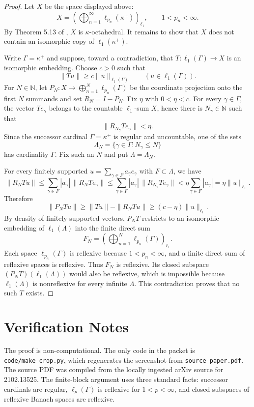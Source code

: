 \documentclass[11pt]{article}
\begin{document}
\begin{proof}
Let $X$ be the space displayed above:
\[
  X=\left(\bigoplus_{n=1}^\infty \ell_{p_n}(\kappa^+)\right)_{\ell_1},
  \qquad 1<p_n<\infty .
\]
By Theorem 5.13 of \cite{CLL}, $X$ is $\kappa$-octahedral.  It remains to show
that $X$ does not contain an isomorphic copy of $\ell_1(\kappa^+)$.

Write $\Gamma=\kappa^+$ and suppose, toward a contradiction, that
$T:\ell_1(\Gamma)\to X$ is an isomorphic embedding.  Choose $c>0$ such that
\[
  \|Tu\|\geq c\|u\|_{\ell_1(\Gamma)}
  \qquad (u\in \ell_1(\Gamma)).
\]
For $N\in\mathbb N$, let $P_N:X\to \bigoplus_{n=1}^N \ell_{p_n}(\Gamma)$ be
the coordinate projection onto the first $N$ summands and set
$R_N=I-P_N$.  Fix $\eta$ with $0<\eta<c$.  For every $\gamma\in\Gamma$,
the vector $Te_\gamma$ belongs to the countable $\ell_1$-sum $X$, hence there
is $N_\gamma\in\mathbb N$ such that
\[
  \|R_{N_\gamma}Te_\gamma\|<\eta .
\]
Since the successor cardinal $\Gamma=\kappa^+$ is regular and uncountable,
one of the sets
\[
  \Lambda_N=\{\gamma\in\Gamma:N_\gamma\leq N\}
\]
has cardinality $\Gamma$.  Fix such an $N$ and put $\Lambda=\Lambda_N$.

For every finitely supported
$u=\sum_{\gamma\in F}a_\gamma e_\gamma$ with $F\subset\Lambda$, we have
\[
  \|R_NTu\|
  \leq \sum_{\gamma\in F}|a_\gamma|\,\|R_NTe_\gamma\|
  \leq \sum_{\gamma\in F}|a_\gamma|\,\|R_{N_\gamma}Te_\gamma\|
  < \eta\sum_{\gamma\in F}|a_\gamma|
  = \eta\|u\|_{\ell_1}.
\]
Therefore
\[
  \|P_NTu\|\geq \|Tu\|-\|R_NTu\|
  \geq (c-\eta)\|u\|_{\ell_1}.
\]
By density of finitely supported vectors, $P_NT$ restricts to an isomorphic
embedding of $\ell_1(\Lambda)$ into the finite direct sum
\[
  F_N=\left(\bigoplus_{n=1}^N \ell_{p_n}(\Gamma)\right)_{\ell_1}.
\]
Each space $\ell_{p_n}(\Gamma)$ is reflexive because $1<p_n<\infty$, and a
finite direct sum of reflexive spaces is reflexive.  Thus $F_N$ is reflexive.
Its closed subspace $(P_NT)(\ell_1(\Lambda))$ would also be reflexive, which is
impossible because $\ell_1(\Lambda)$ is nonreflexive for every infinite
$\Lambda$.  This contradiction proves that no such $T$ exists.
\end{proof}

\section{Verification Notes}

The proof is non-computational.  The only code in the packet is
\texttt{code/make\_crop.py}, which regenerates the screenshot from
\texttt{source\_paper.pdf}.  The source PDF was compiled from the locally
ingested arXiv source for 2102.13525.  The finite-block argument uses three
standard facts: successor cardinals are regular, $\ell_p(\Gamma)$ is reflexive
for $1<p<\infty$, and closed subspaces of reflexive Banach spaces are
reflexive.
\end{document}
